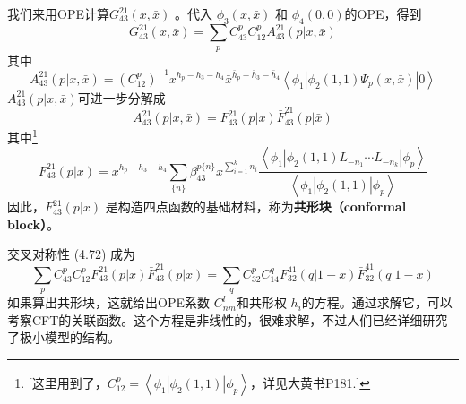 我们来用OPE计算$ G_{43}^{21}(x, \bar{x})$ 。代入 $\phi_3(x,\bar{x})$ 和 $\phi_4(0,0) $的OPE，得到
\begin{equation}
	G_{43}^{21}(x, \bar{x})=\sum_{p} C_{43}^{p} C_{12}^{p} A_{43}^{21}(p | x, \bar{x})
\end{equation}
其中
\begin{equation}
	A_{43}^{21}(p | x, \bar{x})=\left(C_{12}^{p}\right)^{-1} x^{h_{p}-h_{3}-h_{4}} \bar{x}^{\bar{h}_{p}-\bar{h}_{3}-\bar{h}_{4}}\left\langle\phi_{1}\left|\phi_{2}(1,1) \Psi_{p}(x, \bar{x})\right| 0\right\rangle
\end{equation}
$A_{43}^{21}(p | x, \bar{x}) $可进一步分解成
\begin{equation}
	A_{43}^{21}(p | x, \bar{x})=F_{43}^{21}(p| x) \bar{F}_{43}^{21}(p | \bar{x})
\end{equation}
其中\footnote{[这里用到了，$C_{12}^p=\left\langle\phi_{1}\left|\phi_{2}(1,1)\right| \phi_{p}\right\rangle$，详见大黄书P181.]}
\begin{equation}
	F_{43}^{21}(p |x)=x^{h_{p}-h_{3}-h_{4}} \sum_{\{n\}} \beta_{43}^{p\{n\}}x^{\sum_{i=1}^{k} n_{i}} \frac{\left\langle\phi_{1}\left|\phi_{2}(1,1) L_{-n_{1}} \cdots L_{-n_{k}}\right| \phi_{p}\right\rangle}{\left\langle\phi_{1}\left|\phi_{2}(1,1)\right| \phi_{p}\right\rangle}
\end{equation}
因此，$F_{43}^{21}(p |x)$ 是构造四点函数的基础材料，称为\textbf{共形块（conformal block）}。

交叉对称性 (4.72) 成为
\begin{equation}
	\sum_{p} C_{43}^{p} C_{12}^{p} F_{43}^{21}(p | x) \bar{F}_{43}^{21}(p | \bar{x})=\sum_{q} C_{32}^{p} C_{14}^{q} F_{32}^{41}(q | 1-x) \bar{F}_{32}^{41}(q | 1-\bar{x})
\end{equation}
如果算出共形块，这就给出OPE系数 $C_{n m}^{l} $和共形权 $h_i $的方程。通过求解它，可以考察CFT的关联函数。这个方程是非线性的，很难求解，不过人们已经详细研究了极小模型的结构。
